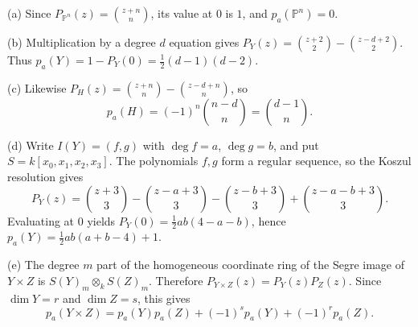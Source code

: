(a) Since $P_{\mathbb{P}^n}(z)=\binom{z+n}{n}$, its value at $0$ is $1$, and $p_a(\mathbb{P}^n)=0$.

(b) Multiplication by a degree $d$ equation gives $P_Y(z)=\binom{z+2}{2}-\binom{z-d+2}{2}$. Thus $p_a(Y)=1-P_Y(0)=\frac12(d-1)(d-2)$.

(c) Likewise $P_H(z)=\binom{z+n}{n}-\binom{z-d+n}{n}$, so
\[p_a(H)=(-1)^n\binom{n-d}{n}=\binom{d-1}{n}.\]

(d) Write $I(Y)=(f,g)$ with $\deg f=a$, $\deg g=b$, and put $S=k[x_0,x_1,x_2,x_3]$. The polynomials $f,g$ form a regular sequence, so the Koszul resolution gives
\[P_Y(z)=\binom{z+3}{3}-\binom{z-a+3}{3}-\binom{z-b+3}{3}+\binom{z-a-b+3}{3}.\]
Evaluating at $0$ yields $P_Y(0)=\frac12ab(4-a-b)$, hence $p_a(Y)=\frac12ab(a+b-4)+1$.

(e) The degree $m$ part of the homogeneous coordinate ring of the Segre image of $Y\times Z$ is $S(Y)_m\otimes_k S(Z)_m$. Therefore $P_{Y\times Z}(z)=P_Y(z)P_Z(z)$. Since $\dim Y=r$ and $\dim Z=s$, this gives
\[p_a(Y\times Z)=p_a(Y)p_a(Z)+(-1)^s p_a(Y)+(-1)^r p_a(Z).\]
